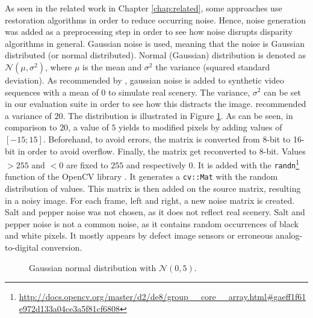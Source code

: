As seen in the related work in Chapter \ref{chap:related}, some approaches use restoration algorithms in order to reduce occurring noise.
Hence, noise generation was added as a preprocessing step in order to see how noise disrupts disparity algorithms in general.
Gaussian noise is used, meaning that the noise is Gaussian distributed (or normal distributed).
Normal (Gaussian) distribution is denoted as $\mathcal{N}(\mu,\sigma^2)$, where $\mu$ is the mean and $\sigma^2$ the variance (squared standard deviation).
\newline\newline\noindent As recommended by \citep{richardt2010real}, gaussian noise is added to synthetic video sequences with a mean of $0$ to simulate real scenery.
The variance, $\sigma^2$ can be set in our evaluation suite in order to see how this distracts the image.
\citeauthor{richardt2010real} recommended a variance of $20$.
The distribution is illustrated in Figure \ref{fig:gaussian}.
As can be seen, in comparison to $20$, a value of $5$ yields to modified pixels by adding values of $[-15;15]$.
Beforehand, to avoid errors, the matrix is converted from 8-bit to 16-bit in order to avoid overflow.
Finally, the matrix get reconverted to 8-bit.
Values $> 255$ and $< 0$ are fixed to $255$ and respectively $0$.
\newline\newline\noindent It is added with the \texttt{randn}\footnote{\url{http://docs.opencv.org/master/d2/de8/group__core__array.html\#gaeff1f61e972d133a04ce3a5f81cf6808}} function of the OpenCV library \citep{opencv_library}.
It generates a \texttt{cv::Mat} with the random distribution of values.
This matrix is then added on the source matrix, resulting in a noisy image.
For each frame, left and right, a new noise matrix is created.
Salt and pepper noise was not chosen, as it does not reflect real scenery.
Salt and pepper noise is not a common noise, as it contains random occurrences of black and white pixels.
It mostly appears by defect image sensors or erroneous analog-to-digital conversion.

\begin{figure}[h!]
  \vspace{1cm}
  \centering
  \caption[Gaussian normal distribution]{Gaussian normal distribution with $\mathcal{N}(0,5)$.}
  \label{fig:gaussian}
\end{figure}

